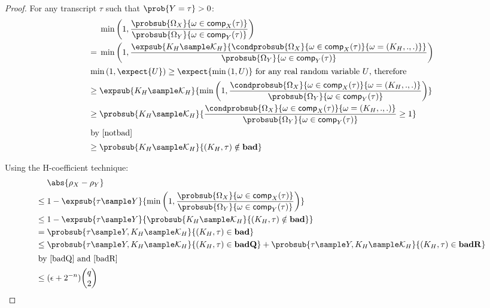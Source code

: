 \documentclass[eprint.tex]{subfiles}
\begin{document}
\begin{proof}
    For any transcript $\tau$ such that $\prob{Y = \tau} > 0$:
    \begin{align*}
        {}& \minone{
               \frac{\probsub{\Omega_X}{\omega \in \comp_X(\tau)}}
               {\probsub{\Omega_Y}{\omega \in \comp_Y(\tau)}}
            } \\
        ={}& \minone{
              \frac{\expsub{K_H \sample \mathcal{K}_H}{\condprobsub{\Omega_X}{\omega \in \comp_X(\tau)}{\omega = (K_H, ., .)}}}
              {\probsub{\Omega_Y}{\omega \in \comp_Y(\tau)}}} \\
        \intertext{$\minone{\expect{U}} \geq \expect{\minone{U}}$ for any real random variable $U$, therefore}
        \geq{}&
            \expsub{K_H \sample \mathcal{K}_H}{
              \minone{
              \frac{\condprobsub{\Omega_X}{\omega \in \comp_X(\tau)}{\omega = (K_H, ., .)}}
              {\probsub{\Omega_Y}{\omega \in \comp_Y(\tau)}}
              }} \\
        \geq{}&
            \probsub{K_H \sample \mathcal{K}_H}{
                \frac{\condprobsub{\Omega_X}{\omega \in \comp_X(\tau)}{\omega = (K_H, ., .)}}
                {\probsub{\Omega_Y}{\omega \in \comp_Y(\tau)}} \geq 1
            } \\
        \intertext{by \autoref{notbad}}
        \geq{}& \probsub{K_H \sample \mathcal{K}_H}{(K_H, \tau) \notin \bad} \\
    \end{align*}

    Using the H-coefficient technique:
    \begin{align*}
        {}&\abs{\rho_X - \rho_Y} \\
        \leq{}& 1 - \expsub{\tau \sample Y}{\minone{
               \frac{\probsub{\Omega_X}{\omega \in \comp_X(\tau)}}
               {\probsub{\Omega_Y}{\omega \in \comp_Y(\tau)}}
            }} \\
        \leq{}& 1 - \expsub{\tau \sample Y}{
            \probsub{K_H \sample \mathcal{K}_H}{(K_H, \tau) \notin \bad}} \\
        = {}& \probsub{\tau \sample Y, K_H \sample \mathcal{K}_H}{(K_H, \tau) \in \bad} \\
        \leq {}& \probsub{\tau \sample Y, K_H \sample \mathcal{K}_H}{(K_H, \tau) \in \badQ}
         + \probsub{\tau \sample Y, K_H \sample \mathcal{K}_H}{(K_H, \tau) \in \badR} \\
         \intertext{by \autoref{badQ} and \autoref{badR}}
        \leq {}& (\epsilon + 2^{-n})\binom{q}{2} \qedhere \\
    \end{align*}
\end{proof}
\end{document}
